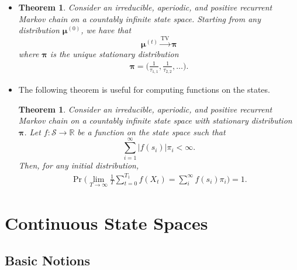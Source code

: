 \documentclass[10pt]{article}
\newtheorem{theorem}[lemma]{Theorem}
\newcommand{\mrm}[1]{\mathrm{#1}}
\newcommand{\ves}[1]{\boldsymbol{#1}}
\newcommand{\Real}{\mathbb{R}}
\begin{document}
\begin{itemize}
  \item \begin{theorem}
    Consider an irreducible, aperiodic, and positive recurrent Markov chain on a countably infinite state space. Starting from any distribution $\ves{\mu}^{(0)}$, we have that $$ \ves{\mu}^{(t)} \xrightarrow{\mrm{TV}} \ves{\pi}$$ where $\ves{\pi}$ is the unique stationary distribution
    \begin{align*}
        \ves{\pi} = \bigg( \frac{1}{\tau_{1,1}}, \frac{1}{\tau_{2,2}}, \dotsc \bigg).
    \end{align*}
  \end{theorem}

  \item The following theorem is useful for computing functions on the states.
  
  \begin{theorem}
    Consider an irreducible, aperiodic, and positive recurrent Markov chain on a countably infinite state space with stationary distribution $\ves{\pi}$. Let $f: \mathcal{S} \rightarrow \Real$ be a function on the state space such that $$\sum_{i=1}^\infty |f(s_i)| \pi_i < \infty.$$ Then, for any initial distribution,
    \begin{align*}
        \Pr \bigg( \lim_{T \rightarrow \infty} \frac{1}{T} \sum_{t=0}^{T_1} f(X_t) = \sum_{i}^\infty f(s_i) \pi_i \bigg) = 1.
    \end{align*}
  \end{theorem}
\end{itemize}

\section{Continuous State Spaces}

\subsection{Basic Notions}
\end{document}
